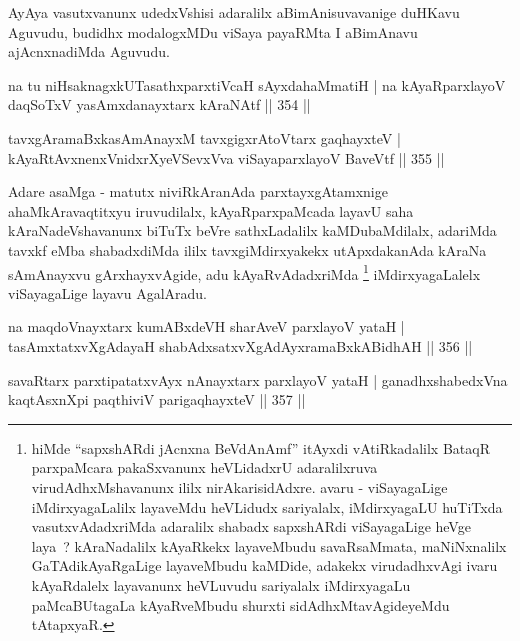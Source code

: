 \begin{artha}
AyAya vasutxvanunx udedxVshisi adaralilx aBimAnisuvavanige duHKavu Aguvudu, budidhx modalogxMDu viSaya payaRMta I aBimAnavu ajAcnxnadiMda Aguvudu.
\end{artha}


\begin{shl}
na tu niHsaknagxkUTasathxparxtiVcaH sAyxdahaMmatiH |
na kAyaRparxlayoV daqSoTxV yasAmxdanayxtarx kAraNAtf \hfill || 354 ||
\end{shl}

\begin{shl}
tavxgAramaBxkasAmAnayxM tavxgigxrA\s toV\s tarx gaqhayxteV |
kAyaRtAvxnenxVnidxrXyeVSevxVva viSayaparxlayoV BaveVtf \hfill || 355 ||
\end{shl}

\begin{artha}
Adare asaMga - matutx niviRkAranAda parxtayxgAtamxnige ahaMkAravaqtitxyu iruvudilalx, kAyaRparxpaMcada layavU saha kAraNadeVshavanunx biTuTx beVre sathxLadalilx kaMDubaMdilalx, adariMda tavxkf eMba shabadxdiMda ililx tavxgiMdirxyakekx utApxdakanAda kAraNa sAmAnayxvu gArxhayxvAgide, adu kAyaRvAdadxriMda \footnote{hiMde ``sapxshARdi jAcnxna BeVdAnAmf'' itAyxdi vAtiRkadalilx BataqR parxpaMcara pakaSxvanunx heVLidadxrU adaralilxruva virudAdhxMshavanunx ililx nirAkarisidAdxre. avaru - viSayagaLige iMdirxyagaLalilx layaveMdu heVLidudx sariyalalx, iMdirxyagaLU huTiTxda vasutxvAdadxriMda adaralilx shabadx sapxshARdi viSayagaLige heVge laya~? kAraNadalilx kAyaRkekx layaveMbudu savaRsaMmata, maNiNxnalilx GaTAdikAyaRgaLige layaveMbudu kaMDide, adakekx virudadhxvAgi ivaru kAyaRdalelx layavanunx heVLuvudu sariyalalx iMdirxyagaLu paMcaBUtagaLa kAyaRveMbudu shurxti sidAdhxMtavAgideyeMdu tAtapxyaR.} iMdirxyagaLalelx viSayagaLige layavu AgalAradu.
\end{artha}

\begin{shl}
na maqdoV\s nayxtarx kumABxdeVH sharAveV parxlayoV yataH |
tasAmxtatxvXgAdayaH shabAdxsatxvXgAdAyxramaBxkABidhAH \hfill || 356 ||
\end{shl}

\begin{shl}
savaRtarx parxtipatatxvAyx nAnayxtarx parxlayoV yataH |
ganadhxshabedxVna kaqtAsxnX\s pi paqthiviV parigaqhayxteV \hfill || 357 ||
\end{shl}

